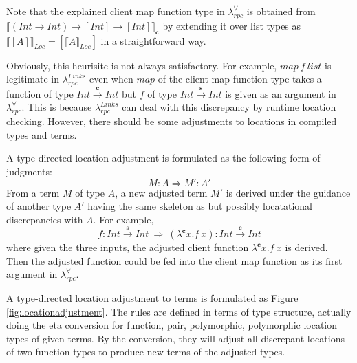 \documentclass[a4paper]{article}
\theoremstyle{plain}
\theoremstyle{definition}
\newcommand{\polyrpc}{$\lambda_{rpc}^{\forall}$\xspace}
\newcommand{\linksrpc}{$\lambda_{rpc}^{Links}$\xspace}
\newcommand{\client}{\textbf{c}}
\newcommand{\server}{\textbf{s}}
\newcommand{\lamL}[3]{\lambda^{#1}#2.#3}
\newcommand{\funL}[1]{\xrightarrow{#1}}
\newcommand{\linkstycomp}[2]{\llbracket#1\rrbracket_{#2}}
\newcommand{\adjcomp}[4]{#1:#2 \Rightarrow #3:#4}
\newcommand{\Loc}{Loc}
\begin{document}
Note that the explained client map function type in \polyrpc is
obtained from $\linkstycomp{(Int \rightarrow Int) \rightarrow [Int] \rightarrow
  [Int]}{\client}$ by extending it over list types as
$\linkstycomp{[A]}{\Loc} = [ \linkstycomp{A}{\Loc} ]$ in a straightforward way.

Obviously, this heurisitc is not always satisfactory.
%
For example, $map \ f \ list$ is legitimate in \linksrpc even when
$map$ of the client map function type takes a function of type $Int
\funL{\client} Int$ but $f$ of type $Int \funL{\server} Int$ is given
as an argument in \polyrpc.
%
This is because \linksrpc can deal with this discrepancy by runtime
location checking.
%
However, there should be some adjustments to locations in compiled
types and terms.

A type-directed location adjustment is formulated as the following
form of judgments:
\[
\adjcomp{M}{A}{M'}{A'}
\]
From a term $M$ of type $A$, a new adjusted term $M'$ is derived under
the guidance of another type $A'$ having the same skeleton as but
possibly locatational discrepancies with $A$.
%
For example,
\[
\adjcomp{f}{Int \funL{\server} Int \ }{\ (\lamL{\client}{x}{f
    \ x})}{Int \funL{\client} Int}
\]
where given the three inputs, the adjusted client function
$\lamL{\client}{x}{f \ x}$ is derived.
%
Then the adjusted function could be fed into the client map function
as its first argument in \polyrpc.

A type-directed location adjustment to terms is formulated as Figure
\ref{fig:locationadjustment}. 
%
The rules are defined in terms of type structure, actually doing the
eta conversion for function, pair, polymorphic, polymorphic location
types of given terms.
%
By the conversion, they will adjust all discrepant locations of two
function types to produce new terms of the adjusted types.
%
\end{document}
